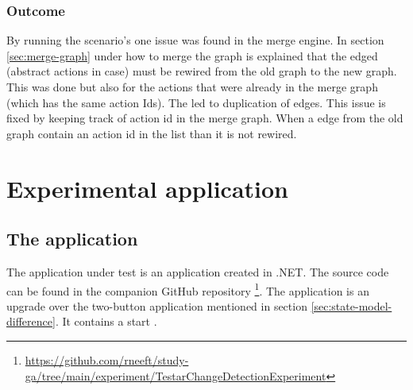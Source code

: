\subsubsection{Outcome}
By running the scenario's one issue was found in the merge engine. In section \ref{sec:merge-graph} under how to merge the graph is explained that the edged (abstract actions in \testar case) must be rewired from the old graph to the new graph. This was done but also for the actions that were already in the merge graph (which has the same action Ids). The led to duplication of edges. This issue is fixed by keeping track of action id in the merge graph. When a edge from the old graph contain an action id in the list than it is not rewired.

\section{Experimental application} \label{sec:experimental-application}

\subsection{The application}
The application under test is an application created in .NET. The source code can be found in the companion GitHub repository \footnote{\url{https://github.com/rneeft/study-ga/tree/main/experiment/TestarChangeDetectionExperiment}}. The application is an upgrade over the two-button application mentioned in section \ref{sec:state-model-difference}. It contains a start .

